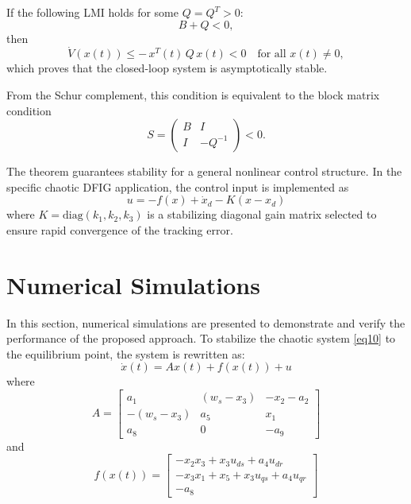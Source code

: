 \documentclass[conference]{IEEEtran}
\begin{document}
If the following LMI holds for some $Q = Q^{T} > 0$:
\begin{equation*}
B + Q < 0,
\end{equation*}
then
\begin{equation*}
\dot{V}\left( x(t) \right) \leq - \, x^{T}(t)\, Q\, x(t) < 0\quad\text{for all }x(t) \neq 0,
\end{equation*}
which proves that the closed-loop system is asymptotically stable.

From the Schur complement, this condition is equivalent to the block matrix condition
\begin{equation*}
S = \begin{pmatrix}
B & I \\
I & - Q^{-1}
\end{pmatrix} < 0.
\end{equation*}

The theorem guarantees stability for a general nonlinear control structure. In the specific chaotic DFIG application, the control input is implemented as
\begin{equation}
u = - f(x) + \dot{x}_{d} - K\left( x - x_{d} \right)
\label{eq22}
\end{equation}
where $K = \text{diag}\left( k_{1},k_{2},k_{3} \right)$ is a stabilizing diagonal gain matrix selected to ensure rapid convergence of the tracking error.

\section{Numerical Simulations}

In this section, numerical simulations are presented to demonstrate and verify the performance of the proposed approach. To stabilize the chaotic system \eqref{eq10} to the equilibrium point, the system is rewritten as:
\begin{equation}
\dot{x}(t) = Ax(t) + f(x(t)) + u
\label{eq23}
\end{equation}
where
\begin{equation*}
A = \begin{bmatrix}
a_{1} & \left( w_{s} - x_{3} \right) & - x_{2} - a_{2} \\
- \left( w_{s} - x_{3} \right) & a_{5} & x_{1} \\
a_{8} & 0 & - a_{9}
\end{bmatrix}
\end{equation*}
and
\begin{equation*}
f(x(t)) = \begin{bmatrix}
- x_{2}x_{3} + x_{3}u_{ds} + a_{4}u_{dr} \\
- x_{3}x_{1} + x_{5} + x_{3}u_{qs} + a_{4}u_{qr} \\
- a_{8}
\end{bmatrix}
\end{equation*}
\end{document}
